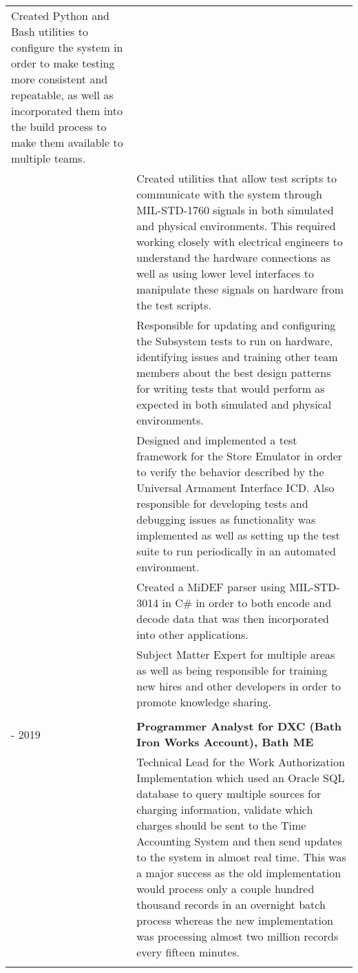 \documentclass[11pt, letterpaper]{article}
\begin{document}
\begin{longtable}{p{1in}|p{6in}}
        Created Python and Bash utilities to configure the system in order to make testing more consistent and repeatable, as well as incorporated them into the build process to make them available to multiple teams.\vspace{0.2cm}\\&
        Created utilities that allow test scripts to communicate with the system through MIL-STD-1760 signals in both simulated and physical environments.
        This required working closely with electrical engineers to understand the hardware connections as well as using lower level interfaces to manipulate these signals on hardware from the test scripts.\vspace{0.2cm}\\&
        Responsible for updating and configuring the Subsystem tests to run on hardware, identifying issues and training other team members about the best design patterns for writing tests that would perform as expected in both simulated and physical environments.\vspace{0.2cm}\\&
        Designed and implemented a test framework for the Store Emulator in order to verify the behavior described by the Universal Armament Interface ICD. Also responsible for developing tests and debugging issues as functionality was implemented as well as setting up the test suite to run periodically in an automated environment.\vspace{0.2cm}\\&
        Created a MiDEF parser using MIL-STD-3014 in C\# in order to both encode and decode data that was then incorporated into other applications.\vspace{0.2cm}\\&
	    Subject Matter Expert for multiple areas as well as being responsible for training new hires and other developers in order to promote knowledge sharing.\\
    \multicolumn{2}{c}{}\\
	\centering 2015 - 2019 & \textbf{Programmer Analyst for DXC (Bath Iron Works Account), Bath ME}\vspace{0.1cm}\\&
        Technical Lead for the Work Authorization Implementation which used an Oracle SQL database to query multiple sources for charging information, validate which charges should be sent to the Time Accounting System and then send updates to the system in almost real time.
        This was a major success as the old implementation would process only a couple hundred thousand records in an overnight batch process whereas the new implementation was processing almost two million records every fifteen minutes.\vspace{0.2cm}\\&

\end{longtable}
\end{document}
